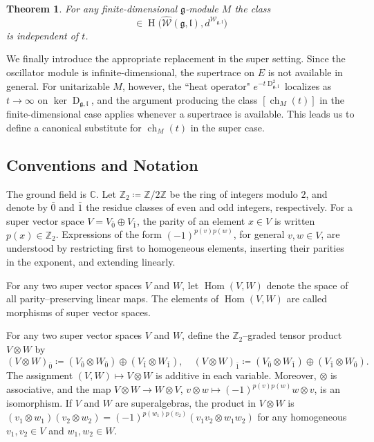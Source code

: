\documentclass[11pt]{amsart}
\newcommand{\Hom}{\operatorname{Hom}}
\newcommand{\Dirac}{\operatorname{D}}
\def\WW{{\mathcal{W}}}
\def\CC{{\mathbb C}}
\def\H{{\operatorname{H}}}
\def\ll{{\mathfrak l}}
\def\gg{{\mathfrak{g}}}
\def\ZZ{{\mathbb Z}}
\theoremstyle{plain}
\newtheorem{theorem}{Theorem}
\theoremstyle{remark}
\theoremstyle{definition}
\numberwithin{equation}{section}
\theoremstyle{remark}
\begin{document}
\begin{theorem}
For any finite-dimensional $\gg$-module $M$ the class
\begin{equation}
[\operatorname{ch}_{M}(t)]\in \H\bigl(\widehat{\WW}(\gg,\ll),d^{\WW_{\gg,\ll}}\bigr)
\end{equation}
is independent of $t$.
\end{theorem}

We finally introduce the appropriate replacement in the super setting. Since the oscillator module is infinite-dimensional, the supertrace on $E$ is not available in general. For unitarizable $M$, however, the ``heat operator" $e^{-t\Dirac_{\gg,\ll}^{2}}$ localizes as $t\to\infty$ on $\ker \Dirac_{\gg,\ll}$, and the argument producing the class $[\operatorname{ch}_{M}(t)]$ in the finite-dimensional case applies whenever a supertrace is available. This leads us to define a canonical substitute for $\operatorname{ch}_{M}(t)$ in the super case.

\subsection{Conventions and Notation} \label{subsec::conventions}The ground field is $\CC$. Let $\ZZ_{2}\coloneqq \ZZ/2\ZZ$ be the ring of integers modulo $2$, and denote by $\bar{0}$ and $\bar{1}$ the residue classes of even and odd integers, respectively. For a super vector space $V=V_{\bar{0}}\oplus V_{\bar{1}}$, the parity of an element $x\in V$ is written $p(x)\in\ZZ_{2}$. Expressions of the form $(-1)^{p(v)p(w)}$, for general $v,w\in V$, are understood by restricting first to homogeneous elements, inserting their parities in the exponent, and extending linearly. 

For any two super vector spaces $V$ and $W$, let $\Hom(V,W)$ denote the space of all parity–preserving linear maps. The elements of $\Hom(V,W)$ are called morphisms of super vector spaces.

For any two super vector spaces $V$ and $W$, define the $\ZZ_{2}$–graded tensor product $V\otimes W$ by
\[
(V\otimes W)_{\bar{0}}\coloneqq (V_{\bar{0}}\otimes W_{\bar{0}})\oplus(V_{\bar{1}}\otimes W_{\bar{1}}),\quad
(V\otimes W)_{\bar{1}}\coloneqq (V_{\bar{0}}\otimes W_{\bar{1}})\oplus(V_{\bar{1}}\otimes W_{\bar{0}}).
\]
The assignment $(V,W)\mapsto V\otimes W$ is additive in each variable. Moreover, $\otimes$ is associative, and the map $V\otimes W\to W\otimes V$, $v\otimes w\mapsto(-1)^{p(v)p(w)}w\otimes v$, is an isomorphism. If $V$ and $W$ are superalgebras, the product in $V \otimes W$ is $(v_{1}\otimes w_{1})(v_{2}\otimes w_{2})=(-1)^{p(w_{1})p(v_{2})}(v_{1}v_{2}\otimes w_{1}w_{2})$ for any homogeneous $v_{1},v_{2}\in V$ and $w_{1},w_{2} \in W$.
\end{document}
